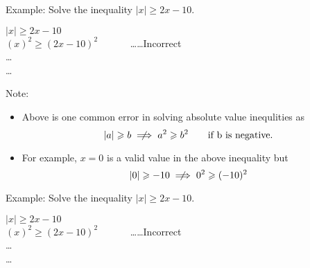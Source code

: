 \begin{tcbraster}[standard,      raster equal height=rows,raster columns=2,
colback=LightGreen,colframe=DarkGreen,colbacktitle=LimeGreen!75!DarkGreen,
left=1mm,right=1mm,top=1mm,bottom=1mm,middle=1mm]

\begin{tcolorbox}
    Example: Solve the inequality $ \lvert x \rvert \geqslant 2x-10. $


\tcbline 



\begin{warningEnv}
     $ \lvert x \rvert \geqslant 2x-10 $ \\
     $ (x)^2 \geqslant (2x-10)^2 \quad \quad \quad $ \dots \dots Incorrect \\
     \dots \\
     \dots     
\end{warningEnv}

\tcbline


Note:
\begin{itemize}
       \item[] Above is one common error in solving absolute value inequlities as 
                \[    \lvert a \rvert \geqslant b       \centernot\implies     a^2 \geqslant b^2  \quad  \quad \text{if b is negative.} \]    
    
      \item[]  For example, $x=0$ is a valid value in the above inequality but
                \[     \lvert 0 \rvert \geqslant -10       \centernot\implies     0^2 \geqslant (-10)^2 \] 
\end{itemize}






    
\end{tcolorbox}
\begin{tcolorbox}
    Example: Solve the inequality $ \lvert x \rvert \geqslant 2x-10. $


\tcbline 



\begin{warningEnv}
     $ \lvert x \rvert \geqslant 2x-10 $ \\
     $ (x)^2 \geqslant (2x-10)^2 \quad \quad \quad $ \dots \dots Incorrect \\
     \dots \\
     \dots     
\end{warningEnv}


\end{tcolorbox}
\end{tcbraster}
